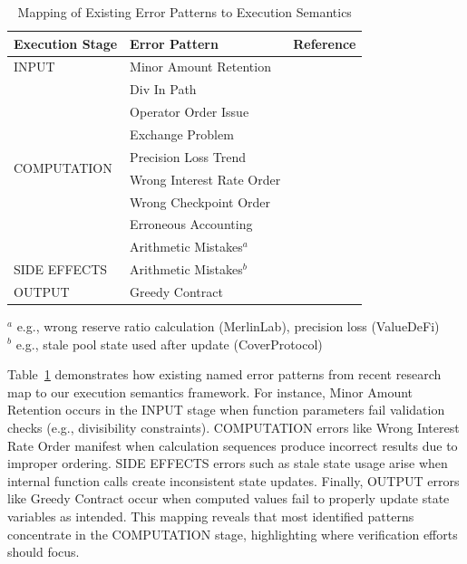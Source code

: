 \documentclass[pdflatex,sn-basic]{sn-jnl}%
\theoremstyle{thmstyleone}%
\theoremstyle{thmstyletwo}%
\theoremstyle{thmstylethree}%
\begin{document}
\begin{table}[!h]
\centering
\caption{Mapping of Existing Error Patterns to Execution Semantics}
\label{tab:error_mapping}
\begin{tabular}{|l|l|l|}
\hline
\textbf{Execution Stage} & \textbf{Error Pattern} & \textbf{Reference} \\
\hline
\multirow{1}{*}{INPUT}
& Minor Amount Retention & \citep{numscout} \\
\hline
\multirow{8}{*}{COMPUTATION}
& Div In Path & \citep{numscout} \\
& Operator Order Issue & \citep{numscout} \\
& Exchange Problem & \citep{numscout} \\
& Precision Loss Trend & \citep{numscout} \\
& Wrong Interest Rate Order & \citep{gptscan} \\
& Wrong Checkpoint Order & \citep{gptscan} \\
& Erroneous Accounting & \citep{exploitablebugs} \\
& Arithmetic Mistakes$^{a}$ & \citep{defiattacks} \\
\hline
SIDE EFFECTS & Arithmetic Mistakes$^{b}$ & \citep{defiattacks} \\
\hline
OUTPUT & Greedy Contract & \citep{flyinointment} \\
\hline
\end{tabular}
\footnotesize{
$^{a}$ e.g., wrong reserve ratio calculation (MerlinLab), precision loss (ValueDeFi)\\
$^{b}$ e.g., stale pool state used after update (CoverProtocol)
}
\end{table}

Table~\ref{tab:error_mapping} demonstrates how existing named error patterns from recent research map to our execution semantics framework.
For instance, Minor Amount Retention occurs in the INPUT stage when function parameters fail validation checks (e.g., divisibility constraints).
COMPUTATION errors like Wrong Interest Rate Order manifest when calculation sequences produce incorrect results due to improper ordering.
SIDE EFFECTS errors such as stale state usage arise when internal function calls create inconsistent state updates.
Finally, OUTPUT errors like Greedy Contract occur when computed values fail to properly update state variables as intended.
This mapping reveals that most identified patterns concentrate in the COMPUTATION stage, highlighting where verification efforts should focus.
\end{document}
